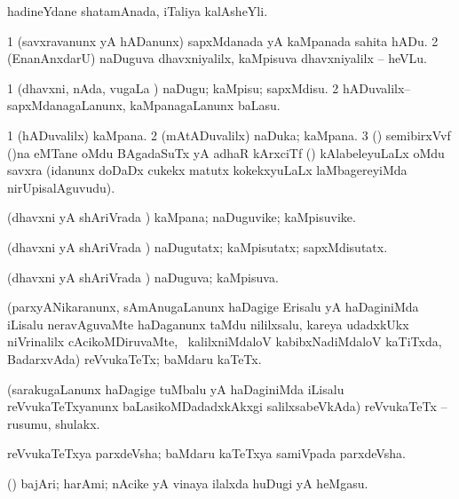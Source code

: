 \bentry
{}
\gl{\nA}
\bmng
hadineYdane shatamAnada, iTaliya kalAsheYli. 
\emng
\eentry

\bentry
{}
\gl{\sakirx}
\bmng
\bnum
\num{1} (savxravanunx yA hADanunx) sapxMdanada yA kaMpanada sahita hADu. 
\num{2} (EnanAnxdarU) naDuguva dhavxniyalilx, kaMpisuva dhavxniyalilx -- heVLu. 
\enum
\emng

\noindent
\gl{\akirx}
\bmng
\bnum
\num{1} (dhavxni, nAda, \mo vugaLa \vi) naDugu; kaMpisu; sapxMdisu. 
\num{2} hADuvalilx--sapxMdanagaLanunx, kaMpanagaLanunx baLasu. 
\enum
\emng
\eentry

\bentry
{}
\gl{\nA}
\bmng
\bnum
\num{1} (hADuvalilx) kaMpana. 
\num{2} (mAtADuvalilx) naDuka; kaMpana. 
\num{3} (\saM) semibirxVvf ()na eMTane oMdu BAgadaSuTx yA adhaR kArxciTf () kAlabeleyuLaLx oMdu savxra (idanunx doDaDx cukekx matutx kokekxyuLaLx laMbagereyiMda nirUpisalAguvudu). 
\enum
\emng
\eentry

\bentry
{}
\gl{\nA}
\bmng
(dhavxni yA shAriVrada \vi) kaMpana; naDuguvike; kaMpisuvike. 
\emng
\eentry

\bentry
{}
\gl{\kirxvi}
\bmng
(dhavxni yA shAriVrada \vi) naDugutatx; kaMpisutatx; sapxMdisutatx. 
\emng
\eentry

\bentry
{}
\gl{\gu}
\bmng
(dhavxni yA shAriVrada \vi) naDuguva; kaMpisuva. 
\emng
\eentry

\bentry
{}
\gl{\nA}
\bmng
(parxyANikaranunx, sAmAnugaLanunx haDagige Erisalu yA haDaginiMda iLisalu neravAguvaMte haDaganunx taMdu nililxsalu, kareya udadxkUkx niVrinalilx cAcikoMDiruvaMte, \sA\ kalilxniMdaloV kabibxNadiMdaloV kaTiTxda, BadarxvAda) reVvukaTeTx; baMdaru kaTeTx. 
\emng
\eentry

\bentry
{}
\gl{\nA}
\bmng
(sarakugaLanunx haDagige tuMbalu yA haDaginiMda iLisalu reVvukaTeTxyanunx baLasikoMDadadxkAkxgi salilxsabeVkAda) reVvukaTeTx -- rusumu, shulakx. 
\emng
\eentry

\bentry
{}
\gl{\nA}
\bmng
reVvukaTeTxya parxdeVsha; baMdaru kaTeTxya samiVpada parxdeVsha. 
\emng
\eentry

\bentry
{}
\gl{\saMkiSx}
\bmng
{} 
\emng
\eentry

\bentry
{} 
\gl{\nA}({\pArxparx}) 
\bmng
bajAri; harAmi; nAcike yA vinaya ilalxda huDugi yA heMgasu. 
\emng
\eentry

